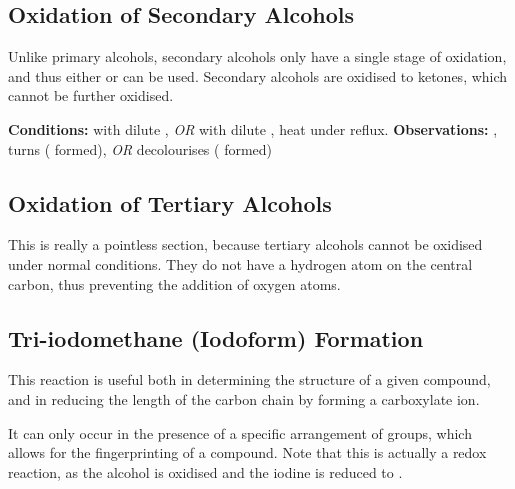 

		\pagebreak
		\subsection{Oxidation of Secondary Alcohols}

			Unlike primary alcohols, secondary alcohols only have a single stage of oxidation, and thus either  or  can be
			used. Secondary alcohols are oxidised to ketones, which cannot be further oxidised.

			\vspace{1.5em}
			\vbox{\textbf{Conditions:}	\tabto{35mm} with dilute , \textit{OR}  with dilute ,
										\tabto{35mm}heat under reflux.}
			\vspace{0.75em}
			\vbox{\textbf{Observations:}\tabto{35mm} , turns 
													( formed), \textit{OR}
										\tabto{35mm}  decolourises ( formed)}



		\subsection{Oxidation of Tertiary Alcohols}

			This is really a pointless section, because tertiary alcohols cannot be oxidised under normal conditions. They do not have a hydrogen
			atom on the central carbon, thus preventing the addition of oxygen atoms.


		\pagebreak
		\subsection{Tri-iodomethane (Iodoform) Formation}

			This reaction is useful both in determining the structure of a given compound, and in reducing the length of the carbon chain by
			forming a carboxylate ion.

			It can only occur in the presence of a specific arrangement of groups, which allows for the fingerprinting of a compound. Note that
			this is actually a redox reaction, as the alcohol is oxidised and the iodine is reduced to .



